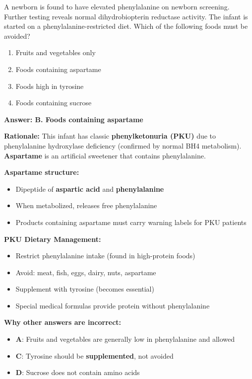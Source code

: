 \begin{exercise}
A newborn is found to have elevated phenylalanine on newborn screening. Further testing reveals normal dihydrobiopterin reductase activity. The infant is started on a phenylalanine-restricted diet. Which of the following foods must be avoided?
\begin{enumerate}[label=\Alph*.]
    \item Fruits and vegetables only
    \item Foods containing aspartame
    \item Foods high in tyrosine
    \item Foods containing sucrose
\end{enumerate}
\end{exercise}

\begin{solution}
\textbf{Answer: B. Foods containing aspartame}

\textbf{Rationale:} This infant has classic \textbf{phenylketonuria (PKU)} due to phenylalanine hydroxylase deficiency (confirmed by normal BH4 metabolism). \textbf{Aspartame} is an artificial sweetener that contains phenylalanine.

\textbf{Aspartame structure:}
\begin{itemize}
    \item Dipeptide of \textbf{aspartic acid} and \textbf{phenylalanine}
    \item When metabolized, releases free phenylalanine
    \item Products containing aspartame must carry warning labels for PKU patients
\end{itemize}

\textbf{PKU Dietary Management:}
\begin{itemize}
    \item Restrict phenylalanine intake (found in high-protein foods)
    \item Avoid: meat, fish, eggs, dairy, nuts, aspartame
    \item Supplement with tyrosine (becomes essential)
    \item Special medical formulas provide protein without phenylalanine
\end{itemize}

\textbf{Why other answers are incorrect:}
\begin{itemize}
    \item \textbf{A}: Fruits and vegetables are generally low in phenylalanine and allowed
    \item \textbf{C}: Tyrosine should be \textbf{supplemented}, not avoided
    \item \textbf{D}: Sucrose does not contain amino acids
\end{itemize}
\end{solution}

